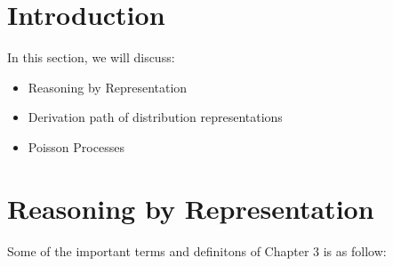 \documentclass[
  letterpaper,
  DIV=11,
  numbers=noendperiod]{scrreprt}
\providecommand{\tightlist}{%
  \setlength{\itemsep}{0pt}\setlength{\parskip}{0pt}}\usepackage{longtable,booktabs,array}
\theoremstyle{definition}
\theoremstyle{plain}
\theoremstyle{remark}
\begin{document}
\hypertarget{introduction-1}{%
\section*{Introduction}\label{introduction-1}}


In this section, we will discuss:

\begin{itemize}
\tightlist
\item
  Reasoning by Representation
\item
  Derivation path of distribution representations
\item
  Poisson Processes
\end{itemize}

\hypertarget{reasoning-by-representation}{%
\section*{Reasoning by
Representation}\label{reasoning-by-representation}}


Some of the important terms and definitons of Chapter 3 is as follow:
\end{document}

